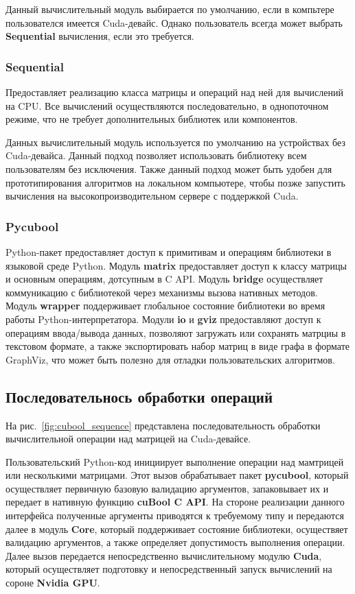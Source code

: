 Данный вычислительный модуль выбирается по умолчанию, если в компьтере пользователся имеется Cuda-девайс.
Однако пользователь всегда может выбрать \textbf{Sequential} вычисления, если это требуется. 

\subsubsection*{Sequential}

Предоставляет реализацию класса матрицы и операций над ней для вычислений на CPU. Все вычислений осуществляются последовательно, в однопоточном режиме, что не требует дополнительных библиотек или компонентов.

Данных вычислительный модуль используется по умолчанию на устройствах без Cuda-девайса. 
Данный подход позволяет использовать библиотеку всем пользователям без исключения. 
Также данный подход может быть удобен для прототипирования алгоритмов на локальном компьютере, 
чтобы позже запустить вычисления на высокопроизводительном сервере с поддержкой Cuda.

\subsubsection*{Pycubool}

Python-пакет предоставляет доступ к примитивам и операциям библиотеки в языковой среде Python.
Модуль \textbf{matrix} предоставляет доступ к классу матрицы и основным операциям, дотсупным в C API.
Модуль \textbf{bridge} осуществляет коммуникацию с библиотекой через механизмы вызова нативных методов. 
Модуль \textbf{wrapper} поддерживает глобальное состояние библиотеки во время работы Python-интерпретатора. 
Модули \textbf{io} и \textbf{gviz} предоставляют доступ к операциям ввода/вывода данных, 
позволяют загружать или сохранять матрциы в текстовом формате, 
а также экспортировать набор матриц в виде графа в формате GraphViz, 
что может быть полезно для отладки пользовательских алгоритмов.

\subsection{Последовательнось обработки операций}

На рис.~\ref{fig:cubool_sequence} представлена последовательность обработки вычислительной операции над матрицей на Cuda-девайсе.

Пользовательский Python-код инициирует выполнение операции над мамтрицей или несколькими матрицами.
Этот вызов обрабатывает пакет \textbf{pycubool}, который осуществляет первичную базовую валидацию аргументов, запаковывает их и передает в нативную функцию \textbf{cuBool C API}.
На стороне реализации данного интерфейса полученные аргументы приводятся к требуемому типу и передаются далее в модуль \textbf{Core}, 
который поддерживает состояние библиотеки, 
осуществяет валидацию аргументов, а также определяет допустимость выполнения операции. 
Далее вызов передается непосредственно вычислительному модулю \textbf{Cuda}, 
который осуществляет подготовку и непосредственный запуск вычислений на сороне \textbf{Nvidia GPU}. 

